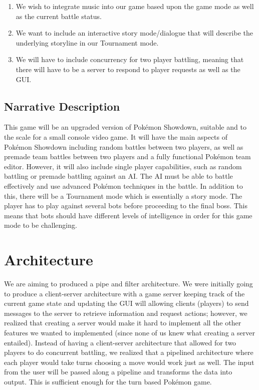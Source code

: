 \documentclass{scrreprt}
\begin{document}
\begin{enumerate}
	\item We wish to integrate music into our game based upon the game mode as well as the current battle status.
	\item We want to include an interactive story mode/dialogue that will describe the underlying storyline in our Tournament mode. 
	\item We will have to include concurrency for two player battling, meaning that there will have to be a server to respond to player requests as well as the GUI. 
\end{enumerate}

\subsection{Narrative Description}
	This game will be an upgraded version of Pok\'emon Showdown, suitable and to the scale for a small console video game. It will have the main aspects of Pok\'emon Showdown including random battles between two players, as well as premade team battles between two players and a fully functional Pok\'emon team editor. However, it will also include single player capabilities, such as random battling or premade battling against an AI. The AI must be able to battle effectively and use advanced Pok\'emon techniques in the battle. In addition to this, there will be a Tournament mode which is essentially a story mode. The player has to play against several bots before proceeding to the final boss. This means that bots should have different levels of intelligence in order for this game mode to be challenging. 
\section{Architecture}
	We are aiming to produced a pipe and filter architecture. We were initially going to produce a client-server architecture with a game server keeping track of the current game state and updating the GUI will allowing clients (players) to send messages to the server to retrieve information and request actions; however, we realized that creating a server would make it hard to implement all the other features we wanted to implemented (since none of us knew what creating a server entailed). Instead of having a client-server architecture that allowed for two players to do concurrent battling, we realized that a pipelined architecture where each player would take turns choosing a move would work just as well. The input from the user will be passed along a pipeline and transforms the data into output. This is sufficient enough for the turn based Pok\'emon game. 
	
\end{document}

